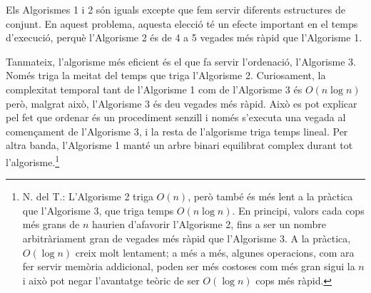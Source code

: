 Els Algorismes 1 i 2 són iguals excepte que fem servir
diferents estructures de conjunt.
En aquest problema, aquesta elecció té un efecte important
en el temps d'execució, perquè l'Algorisme 2
és de 4 a 5 vegades més ràpid que l'Algorisme 1.

Tanmateix, l'algorisme més eficient és el que fa servir l'ordenació,
l'Algorisme 3.
Només triga la meitat del temps que triga l'Algorisme 2.
Curiosament, la complexitat temporal tant de
l'Algorisme 1 com de l'Algorisme 3 és $O(n \log n)$
però, malgrat això, l'Algorisme 3 és deu vegades més ràpid.
Això es pot explicar pel fet que
ordenar és un procediment senzill i només s'executa
una vegada al començament de l'Algorisme 3,
i la resta de l'algorisme triga temps lineal.
Per altra banda,
l'Algorisme 1 manté un arbre binari equilibrat complex
durant tot l'algorisme.\footnote{N. del T.: L'Algorisme 2 triga
$O(n)$, però també és més lent a la pràctica que
l'Algorisme 3, que triga temps $O(n\log n)$. En
principi, valors cada cops més grans de $n$ haurien d'afavorir
l'Algorisme 2, fins a ser un nombre arbitràriament gran de vegades
més ràpid que l'Algorisme 3. A la pràctica, $O(\log n)$ creix molt
lentament; a més a més, algunes operacions, com ara fer servir memòria
addicional, poden ser més costoses com més gran sigui la $n$
i això pot negar l'avantatge teòric de ser $O(\log n)$ cops més ràpid.}

